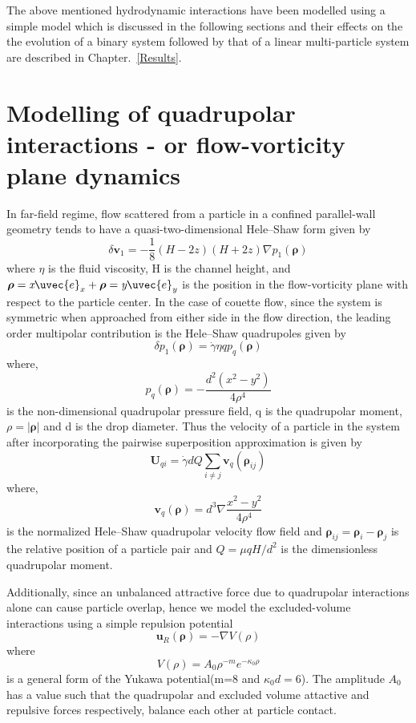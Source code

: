 The above mentioned hydrodynamic interactions have been modelled using a simple model which is discussed in the following sections and their effects on the the evolution of a binary system followed by that of a linear multi-particle system are described in Chapter.~\ref{Results}.

\section{Modelling of quadrupolar interactions - or flow-vorticity plane dynamics}

In far-field regime, flow scattered from a particle in a confined parallel-wall geometry tends to have a quasi-two-dimensional Hele--Shaw form given by
\begin{equation}
  \delta \mathbf{v}_{1} = -\frac{1}{8}(H-2z)(H+2z) \nabla p_1(\bm{\rho})
\end{equation}
where $\eta$ is the fluid viscosity, H is the channel height, and $\bm\rho = \textit{x} \uvec{e}_x + \bm\rho = \textit{y}\uvec{e}_y$ is the position in the flow-vorticity plane with respect to the particle center.
In the case of couette flow, since the system is symmetric when approached from either side in the flow direction, the leading order multipolar contribution is the Hele--Shaw quadrupoles given by
\begin{equation}
  \delta p_1(\bm\rho) = \dot{\gamma}\eta q p_q(\bm\rho)
\end{equation}
where,
\begin{equation}
  p_q(\bm\rho) = -\frac{d^2(x^2 - y^2)}{4 \rho^4}
\end{equation}
is the non-dimensional quadrupolar pressure field, q is the quadrupolar moment, $\rho = \left|\bm{\rho}\right|$ and d is the drop diameter. Thus the velocity of a particle in the system after incorporating the pairwise superposition approximation is given by
\begin{equation}
  \mathbf{U}_{qi} = \dot{\gamma}dQ \sum_{i \neq j}\mathbf{v}_q(\bm{\rho}_{ij})
\end{equation}
where,
\begin{equation}
  \mathbf{v}_q(\bm\rho) = d^3 \nabla \frac{x^2 - y^2}{4 \rho^4}
\end{equation}
is the normalized Hele--Shaw quadrupolar velocity flow field and $\bm{\rho}_{ij} = \bm{\rho}_{i}-\bm{\rho}_{j}$ is the relative position of a particle pair and $Q = \mu q {H/d}^2$ is the dimensionless quadrupolar moment.

Additionally, since an unbalanced attractive force due to quadrupolar interactions alone can cause particle overlap, hence we model the excluded-volume interactions using a simple repulsion potential
\begin{equation}
  \mathbf{u}_R(\bm\rho) = -\nabla V(\rho) 
\end{equation}
where
\begin{equation}
 V(\rho)  = A_0 \rho^{-m}e^{-\kappa_0\rho}
\end{equation}
is a general form of the Yukawa potential(m=8 and $\kappa_0d=6$). The amplitude $A_0$ has a value such that the quadrupolar and excluded volume attactive and repulsive forces respectively, balance each other at particle contact.

